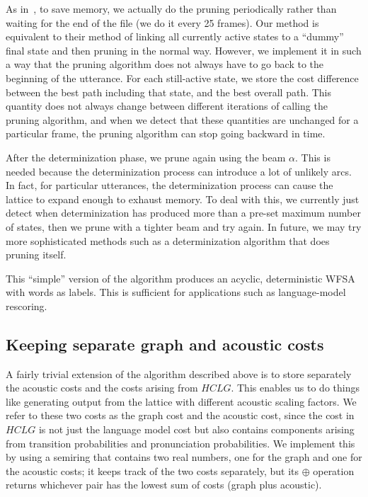 \documentclass{article}
\def\HCLG{{\mathit{HCLG}}}
\begin{document}
As in~\cite{efficient_general}, to save memory, we actually do the pruning
periodically rather than waiting for the end of the file (we do it every 25 frames).
Our method is equivalent to their method of linking all currently active states to a ``dummy''
final state and then pruning in the normal way.  However, we implement it in such a way
that the pruning algorithm does not always have to go back to the beginning of the utterance.
For each still-active state, we store the cost difference between the best path including that
state, and the best overall path.  This quantity does not always change between different
iterations of calling the pruning algorithm, and when we detect that these quantities are 
unchanged for a particular frame, the pruning algorithm can stop going backward in time.

After the determinization phase, we prune again using the beam $\alpha$.  This is needed because
the determinization process can introduce a lot of unlikely arcs.  In fact, for particular
utterances, the determinization process can cause the lattice to expand enough to
exhaust memory.  To deal with this, we currently just detect when determinization
has produced more than a pre-set maximum number of states, then we prune with a tighter
beam and try again.  In future, we may try more sophisticated methods such as a
determinization algorithm that does pruning itself.

This ``simple'' version of the algorithm produces an acyclic, deterministic
WFSA with words as labels.  This is sufficient for applications such as language-model
rescoring.


\subsection{Keeping separate graph and acoustic costs}

A fairly trivial extension of the algorithm described above is to store separately
the acoustic costs and the costs arising from $\HCLG$.  This enables us to do things
like generating output from the lattice with different acoustic scaling factors.
We refer to these two costs as the graph cost and the acoustic cost, since the cost
in $\HCLG$ is not just the language model cost but also contains components
arising from transition probabilities and pronunciation probabilities.  We implement
this by using a semiring that contains two real numbers, one for the graph and one
for the acoustic costs; it keeps track of the two costs separately, but its
$\oplus$ operation returns whichever pair has the lowest sum of costs (graph plus acoustic).
\end{document}

